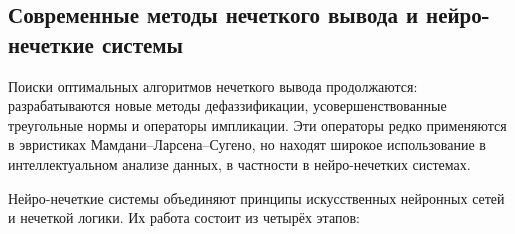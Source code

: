 %
%
\subsection{Современные методы нечеткого вывода и нейро-нечеткие системы}
\label{sec:advanced_inference}

Поиски оптимальных алгоритмов нечеткого вывода продолжаются: разрабатываются
новые методы дефаззификации, усовершенствованные треугольные нормы
и операторы импликации. Эти операторы редко применяются в
эвристиках Мамдани–Ларсена–Сугено, но находят широкое использование в
интеллектуальном анализе данных, в частности в нейро-нечетких
системах.

Нейро-нечеткие системы объединяют принципы искусственных нейронных сетей и
нечеткой логики. Их работа состоит из четырёх этапов:

